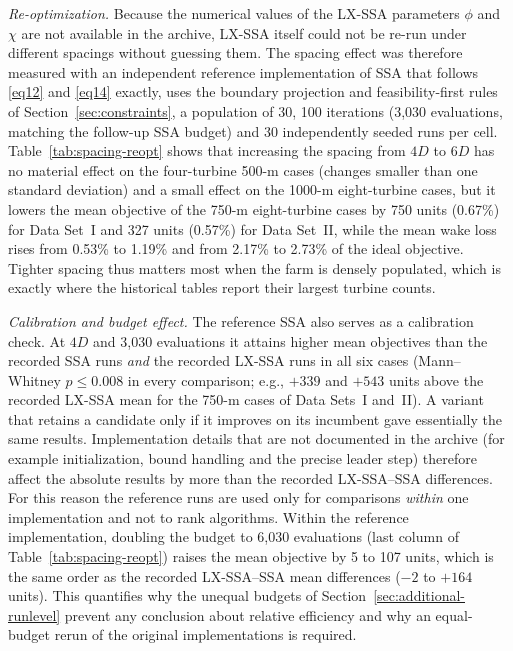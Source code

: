 \emph{Re-optimization.} Because the numerical values of the LX-SSA parameters $\phi$ and $\chi$ are not available in the archive, LX-SSA itself could not be re-run under different spacings without guessing them. The spacing effect was therefore measured with an independent reference implementation of SSA that follows \eqref{eq12} and \eqref{eq14} exactly, uses the boundary projection and feasibility-first rules of Section~\ref{sec:constraints}, a population of 30, 100 iterations (3,030 evaluations, matching the follow-up SSA budget) and 30 independently seeded runs per cell. Table~\ref{tab:spacing-reopt} shows that increasing the spacing from $4D$ to $6D$ has no material effect on the four-turbine 500-m cases (changes smaller than one standard deviation) and a small effect on the 1000-m eight-turbine cases, but it lowers the mean objective of the 750-m eight-turbine cases by 750 units (0.67\%) for Data Set~I and 327 units (0.57\%) for Data Set~II, while the mean wake loss rises from 0.53\% to 1.19\% and from 2.17\% to 2.73\% of the ideal objective. Tighter spacing thus matters most when the farm is densely populated, which is exactly where the historical tables report their largest turbine counts.

\emph{Calibration and budget effect.} The reference SSA also serves as a calibration check. At $4D$ and 3,030 evaluations it attains higher mean objectives than the recorded SSA runs \emph{and} the recorded LX-SSA runs in all six cases (Mann--Whitney $p\le0.008$ in every comparison; e.g., $+339$ and $+543$ units above the recorded LX-SSA mean for the 750-m cases of Data Sets~I and~II). A variant that retains a candidate only if it improves on its incumbent gave essentially the same results. Implementation details that are not documented in the archive (for example initialization, bound handling and the precise leader step) therefore affect the absolute results by more than the recorded LX-SSA--SSA differences. For this reason the reference runs are used only for comparisons \emph{within} one implementation and not to rank algorithms. Within the reference implementation, doubling the budget to 6,030 evaluations (last column of Table~\ref{tab:spacing-reopt}) raises the mean objective by 5 to 107 units, which is the same order as the recorded LX-SSA--SSA mean differences ($-2$ to $+164$ units). This quantifies why the unequal budgets of Section~\ref{sec:additional-runlevel} prevent any conclusion about relative efficiency and why an equal-budget rerun of the original implementations is required.


